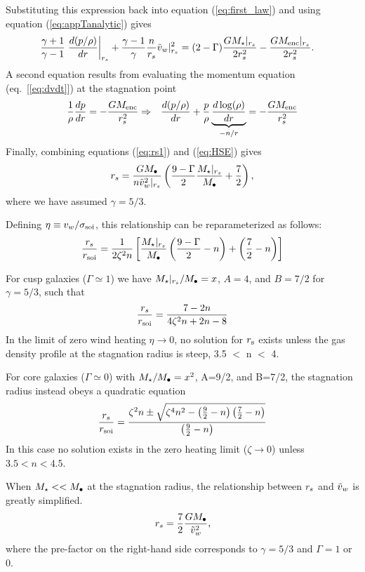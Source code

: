 Substituting this expression back into equation (\ref{eq:first_law}) and using equation (\ref{eq:appTanalytic}) gives
\begin{align}
&\frac{\gamma+1}{\gamma-1}
\left.\frac{d (p/\rho)}{d r}\right|_{r_s}+ \frac{\gamma-1}{\gamma} \frac{n}{r_s} \tilde{v}_{w}|_{r_s}^{2} = (2-\Gamma) \frac{G
  M_{\star}|_{r_s}}{2 r_s^2} -\frac{G M_{\rm enc}|_{r_s}}{2 r_s^2}.  \label{eq:rs1}
\end{align}
A second equation results from evaluating the momentum equation (eq.~[\ref{eq:dvdt}]) at the stagnation point
\begin{align}
&\frac{1}{\rho}\frac{d p}{d r}=- \frac{GM_{\rm enc}}{r_s^2} \Rightarrow
&\frac{d (p/\rho)}{d r}+\frac{p}{\rho}
\underbrace{\frac{d\log(\rho)}{dr}}_{-n/r} = -\frac{G M_{\rm enc}}{r_s^2} \label{eq:HSE}
\end{align}
Finally, combining equations (\ref{eq:rs1}) and (\ref{eq:HSE}) gives 
\begin{align}
r_s=\frac{G M_{\bullet}}{n \tilde{v}_{w}^{2}|_{r_s}}\left(\frac{9-\Gamma}{2} \frac{M_{\star}|_{r_s}}{M_{\bullet}} +\frac{7}{2}\right),
\label{eq:rs2main}
\end{align}
where we have assumed $\gamma=5/3$.

Defining $\eta \equiv v_{w}/\sigma_{\rm soi}$, this relationship can be reparameterized as follows:
\begin{align}
  \frac{r_s}{r_{\rm soi}}=\frac{1}{2 \zeta^2 n}\left[
   \frac{M_{\star}|_{r_s}}{M_{\bullet}}\left(\frac{9-\Gamma}{2}-n\right)+\left(\frac{7}{2}-n\right)\right]
\end{align}

For cusp galaxies ($\Gamma\simeq1$) we have $M_{\star}|_{r_s}/M_{\bullet}=x$, $A=4$, and $B=7/2$ for $\gamma = 5/3$, such that 
\begin{align}
\frac{r_s}{r_{\rm soi}}=\frac{7-2n}{4\zeta^2 n+2n-8}
\end{align}
In the limit of zero wind heating $\eta \rightarrow 0$, no solution for $r_{\rm s}$ exists unless the gas density profile at the stagnation radius is steep, 3.5 $<$ n $<$ 4.  

For core galaxies ($\Gamma \simeq 0$) with $M_{\star}/M_{\bullet}=x^2$, A=9/2,
and B=7/2, the stagnation radius instead obeys a quadratic equation
\begin{align}
\frac{r_s}{r_{\rm soi}}=\frac{\zeta^2 n \pm \sqrt{\zeta^4 n^2 - \left(\frac{9}{2}-n\right)
    \left(\frac{7}{2}-n\right)}}{\left(\frac{9}{2}-n\right)}
\label{eq:rstag}
\end{align}
In this case no solution exists in the zero heating limit ($\zeta \rightarrow 0$) unless $3.5<n<4.5$.

When $M_{\star} << M_{\bullet}$ at the stagnation radius, the relationship between $r_s$ and $\tilde{v}_{w}$ is greatly simplified. 
\begin{align}
r_s=\frac{7}{2}\frac{G M_{\bullet}}{\tilde{v}_{w}^2},
\end{align}
where the pre-factor on the right-hand side corresponds to
$\gamma=5/3$ and $\Gamma=1$ or 0.  



